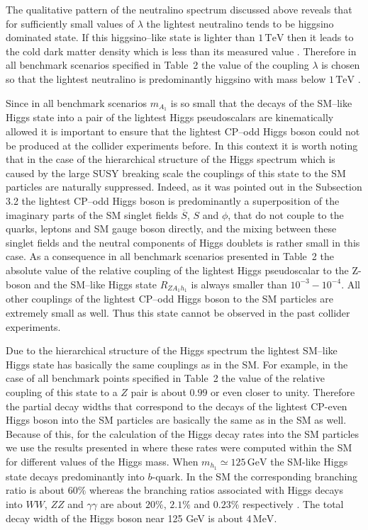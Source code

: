 \documentclass[12pt,a4paper]{article}
\begin{document}
The qualitative pattern of the neutralino spectrum discussed above reveals that for sufficiently small values
of $\lambda$ the lightest neutralino tends to be higgsino dominated state. If this higgsino--like state is lighter than $1\,\mbox{TeV}$
then it leads to the cold dark matter density which is less than its measured value \cite{ArkaniHamed:2006mb}.
Therefore in all benchmark scenarios specified in Table~2 the value of the coupling $\lambda$ is chosen so that the lightest
neutralino is predominantly higgsino with mass below $1\,\mbox{TeV}$ .

Since in all benchmark scenarios $m_{A_1}$ is so small that the decays of the SM--like Higgs state into a pair of the lightest Higgs
pseudoscalars are kinematically allowed it is important to ensure that the lightest CP--odd Higgs boson could not be produced
at the collider experiments before. In this context it is worth noting that in the case of the hierarchical structure of the Higgs spectrum
which is caused by the large SUSY breaking scale the couplings of this state to the SM particles are naturally suppressed. Indeed,
as it was pointed out in the Subsection 3.2 the lightest CP--odd Higgs boson is predominantly a superposition of the imaginary parts
of the SM singlet fields $\overline{S}$, $S$ and $\phi$, that do not couple to the quarks, leptons and SM gauge boson directly, and
the mixing between these singlet fields and the neutral components of Higgs doublets is rather small in this case. As a consequence
in all benchmark scenarios presented in Table~2 the absolute value of the relative coupling of the lightest Higgs pseudoscalar to
the Z-boson and the SM--like Higgs state $R_{Z A_1 h_1}$ is always smaller than $10^{-3}-10^{-4}$. All other couplings of
the lightest CP--odd Higgs boson to the SM particles are extremely small as well. Thus this state cannot be observed in the past
collider experiments.

Due to the hierarchical structure of the Higgs spectrum the lightest SM--like Higgs state has basically the same couplings as in the SM.
For example, in the case of all benchmark points specified in Table~2 the value of the relative coupling of this state to a $Z$ pair
is about $0.99$ or even closer to unity. Therefore the partial decay widths that correspond to the decays of the lightest CP-even
Higgs boson into the SM particles are basically the same as in the SM as well. Because of this, for the calculation of the Higgs decay
rates into the SM particles we use the results presented in \cite{King:2012is} where these rates were computed within the SM for
different values of the Higgs mass. When $m_{h_1}\simeq 125\,\mbox{GeV}$ the SM-like Higgs state decays predominantly
into $b$-quark. In the SM the corresponding branching ratio is about $60\%$ whereas the branching ratios associated with
Higgs decays into $WW$, $ZZ$ and $\gamma\gamma$ are about $20\%$, $2.1\%$ and $0.23\%$ respectively \cite{King:2012is}.
The total decay width of the Higgs boson near 125 GeV is about $4\,\mbox{MeV}$.
\end{document}
